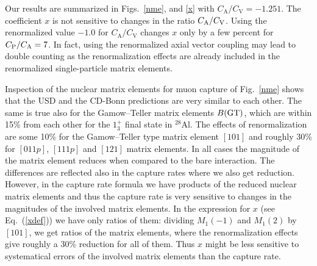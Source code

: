 \begin{multicols}{2}
Our results are summarized in Figs.\ \ref{nme}, and \ref{x} with
$C_{\mathrm A}/C_{\mathrm V}=-1.251$. The coefficient $x$ is not sensitive
to changes in the ratio $C_{\rm A}/C_{\rm V}$. Using the renormalized value
$-1.0$ for $C_{\mathrm A}/C_{\mathrm V}$ changes $x$ only by a few percent for
$C_{\rm P}/C_{\rm A}=7$. In fact, using the renormalized axial vector coupling
may lead to double counting as the renormalization effects are already included
in the renormalized single-particle matrix elements.

Inspection of the nuclear matrix elements for muon
capture of Fig.\ \ref{nme} shows
that the USD and the CD-Bonn predictions are very similar to each other. The
same is true also for the Gamow--Teller matrix elements $B({\rm GT})$, which are
within 15\% from each other for the $1^+_3$ final state in ${}^{28}$Al.
The effects of renormalization are some 10\% for the Gamow--Teller type
matrix element $[101]$ and roughly 30\% for $[011p]$,  $[111p]$ and $[121]$
matrix elements. In all cases the magnitude of the matrix element reduces
when compared to the bare interaction.
The differences are reflected also in the capture
rates where we also get reduction.
However, in the capture rate formula \cite{mor} we have products of the reduced nuclear
matrix elements and thus the capture rate is very sensitive to changes in the
magnitudes of the involved matrix elements. In the expression for $x$ (see
Eq.\ (\ref{xdef})) we have only ratios of them: dividing
$M_1(-1)$ and $M_1(2)$ by $[101]$,
we get ratios of the matrix elements, where the renormalization effects
give roughly a 30\% reduction for all of them.
Thus $x$ might be less sensitive to systematical errors of the involved matrix
elements than the capture rate.


\end{multicols}
